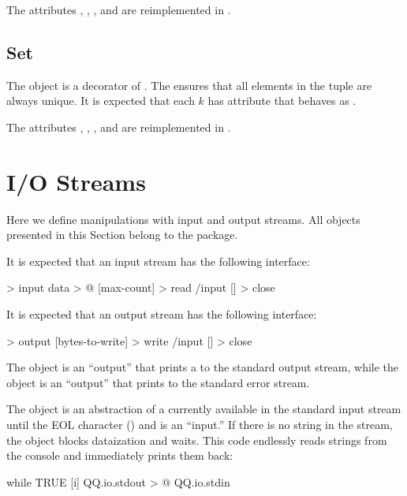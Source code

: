 \documentclass[sigplan,11pt,nonacm]{acmart}
\newcommand\aff[1]{\ff{\textcolor{gray}{$\star$}#1}}
\newcommand\deff[1]{\ff{\textcolor{blue!50!black}{\textbf{#1}}}}
\newcommand\adeff[1]{\aff{\textcolor{blue!50!black}{\textbf{#1}}}}
\begin{document}
The attributes , , , and  are reimplemented in .

\subsection{Set}

The object \deff{set} is a decorator of . The  ensures that all elements in the tuple are always unique. It is expected that each $k$ has  attribute that behaves as .

The attributes , , , and  are reimplemented in .

\section{I/O Streams}\label{sec:streams}

Here we define manipulations with input and output streams. All objects
presented in this Section belong to the  package.

It is expected that an input stream has the following interface:

\begin{ffcode}
[] > input
  data > @
  [max-count] > read /input
  [] > close
\end{ffcode}

It is expected that an output stream has the following interface:

\begin{ffcode}
[] > output
  [bytes-to-write] > write /input
  [] > close
\end{ffcode}

The \adeff{stdout} object is an ``output'' that prints a  to the
standard output stream, while the \adeff{stderr} object is an ``output'' that
prints to the standard error stream.

The \adeff{stdin} object is an abstraction of a  currently available
in the standard input stream until the EOL character () and is an
``input.'' If there is no string in the stream, the object blocks dataization
and waits. This code endlessly reads strings from the console and immediately
prints them back:

\begin{ffcode}
while
  TRUE
  [i]
    QQ.io.stdout > @
      QQ.io.stdin
\end{ffcode}
\end{document}
